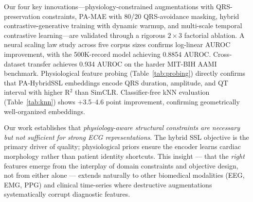 \documentclass[journal,10pt]{IEEEtran}
\begin{document}
Our four key innovations---physiology-constrained augmentations with QRS-preservation constraints, PA-MAE with 80/20 QRS-avoidance masking, hybrid contrastive-generative training with dynamic warmup, and multi-scale temporal contrastive learning---are validated through a rigorous $2 \times 3$ factorial ablation. A neural scaling law study across five corpus sizes confirms log-linear AUROC improvement, with the 500K-record model achieving 0.8854 AUROC. Cross-dataset transfer achieves 0.934 AUROC on the harder MIT-BIH AAMI benchmark. Physiological feature probing (Table~\ref{tab:probing}) directly confirms that PA-HybridSSL embeddings encode QRS duration, amplitude, and QT interval with higher R$^2$ than SimCLR. Classifier-free kNN evaluation (Table~\ref{tab:knn}) shows $+$3.5--4.6 point improvement, confirming geometrically well-organized embeddings.

Our work establishes that \emph{physiology-aware structural constraints are necessary but not sufficient for strong ECG representations}. The hybrid SSL objective is the primary driver of quality; physiological priors ensure the encoder learns cardiac morphology rather than patient identity shortcuts. This insight --- that the \emph{right} features emerge from the interplay of domain constraints and objective design, not from either alone --- extends naturally to other biomedical modalities (EEG, EMG, PPG) and clinical time-series where destructive augmentations systematically corrupt diagnostic features.


\end{document}
